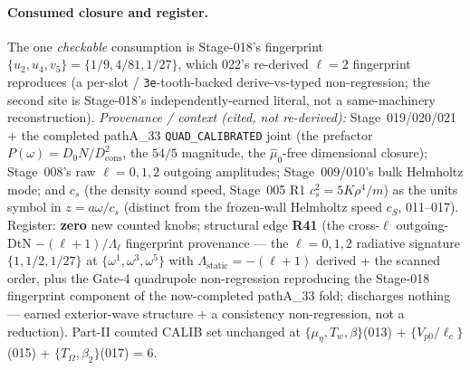 \paragraph{Consumed closure and register.}
The one \emph{checkable} consumption is Stage-018's fingerprint \(\{u_2,u_4,v_5\}=\{1/9,4/81,1/27\}\), which 022's re-derived
\(\ell=2\) fingerprint reproduces (a per-slot / \texttt{3e}-tooth-backed derive-vs-typed non-regression; the second site is
Stage-018's independently-earned literal, not a same-machinery reconstruction). \emph{Provenance / context (cited, not
re-derived):} Stage~019/020/021 + the completed pathA\_33 \texttt{QUAD\_CALIBRATED} joint (the prefactor \(P(\omega)=D_0
N/D_{\mathrm{cons}}^2\), the \(54/5\) magnitude, the \(\hat\mu_0\)-free dimensional closure); Stage~008's raw \(\ell=0,1,2\)
outgoing amplitudes; Stage~009/010's bulk Helmholtz mode; and \(c_s\) (the density sound speed, Stage~005 R1
\(c_s^2=5K\rho^4/m\)) as the units symbol in \(z=a\omega/c_s\) (distinct from the frozen-wall Helmholtz speed \(c_S\),
011--017). Register: \textbf{zero} new counted knobs; structural edge \textbf{R41} (the cross-\(\ell\) outgoing-DtN
\(-(\ell+1)/\Lambda_\ell\) fingerprint provenance --- the \(\ell=0,1,2\) radiative signature \(\{1,1/2,1/27\}\) at
\(\{\omega^1,\omega^3,\omega^5\}\) with \(\Lambda_{\mathrm{static}}=-(\ell+1)\) derived + the scanned order, plus the Gate-4
quadrupole non-regression reproducing the Stage-018 fingerprint component of the now-completed pathA\_33 fold; discharges
nothing --- earned exterior-wave structure + a consistency non-regression, not a reduction). Part-II counted CALIB set
unchanged at \(\{\mu_\eta,T_w,\beta\}\)(013) + \(\{V_{p0}/\ell_c\}\)(015) + \(\{T_\Omega,\beta_2\}\)(017) = 6.

